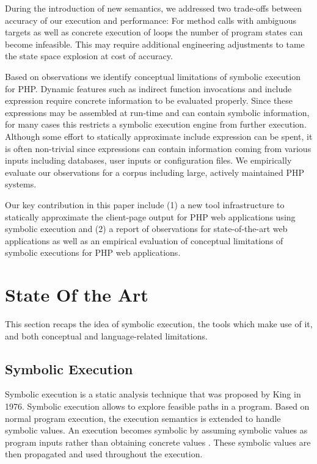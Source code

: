 \documentclass[sigconf]{acmart}
\begin{document}
During the introduction of new semantics, we addressed two  trade-offs between
accuracy of our execution and performance: For method calls with ambiguous
targets as well as concrete execution of loops the number of program states can
become infeasible. This may require additional engineering adjustments to tame
the state space explosion at cost of accuracy.

Based on observations we identify conceptual limitations of symbolic
execution for PHP.  Dynamic features such as indirect function invocations and
include expression require concrete information to be evaluated properly. Since
these expressions may be assembled at run-time and can contain symbolic
information, for many cases this restricts a symbolic execution engine from
further execution.
Although some effort to statically approximate include expression can be spent,
it is often non-trivial since expressions can contain information coming from
various inputs including databases, user inputs or configuration files. We
empirically evaluate our observations for a corpus including large, actively maintained PHP systems.

Our key contribution in this paper include (1)  a new tool infrastructure to
statically approximate the client-page output for PHP web applications using
symbolic execution and (2) a report of observations for state-of-the-art
web applications as well as an empirical evaluation of conceptual limitations
of symbolic executions for PHP web applications.

\section{State Of the Art}\label{sec:stateoftheart}
This section recaps the idea of symbolic
execution, the tools which make use of it, and both conceptual and
language-related limitations.

\subsection{Symbolic Execution}
Symbolic execution is a static analysis technique that was proposed by King
\cite{King1976} in 1976. Symbolic execution allows to explore feasible paths in a program. Based on normal program execution, the execution semantics
is extended to handle symbolic values. An execution becomes symbolic by
assuming symbolic values as program inputs rather than obtaining concrete
values \cite{King1976,Darringer1978}. These symbolic values are then propagated
and used throughout the execution. 
\end{document}

